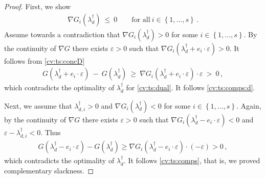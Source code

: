 \begin{proof}
First, we show 
\begin{gather}
  \label{cv:ts:comps:d}
\nabla G_i(\lambda_d^\dagger)
\ 
\le
\ 
0
\qquad
\text{for all}\ 
  i\in \left\{ 1,\ldots, s \right\}
  \,.
\end{gather}
Assume towards a contradiction that 
$
\nabla G_i(\lambda_d^\dagger)>0
$
for some 
$
  i\in \left\{ 1,\ldots, s \right\}
$.
By the continuity of $\nabla G$ there exists $\varepsilon>0$ such that 
$
\nabla G_i(
\lambda_d^\dagger
+
e_i\cdot \varepsilon
)
>
0
$.
It follows from \eqref{cv:ts:concD}
\begin{gather*}
  G
  (
\lambda_d^\dagger
+
e_i\cdot \varepsilon
  )
  \ 
  -
  \ 
  G
  (
\lambda_d^\dagger
  )
  \ 
  \ge
  \ 
\nabla G_i(
\lambda_d^\dagger
+
e_i\cdot \varepsilon
)
\cdot
\varepsilon
\ 
>
\ 
0
\,,
\end{gather*}
which contradicts the optimality of 
$
\lambda_d^\dagger
$
for \eqref{cv:ts:dual}.
It follows \eqref{cv:ts:comps:d}.

Next, 
we assume that
$ \lambda_{d,i}^\dagger>0 $ 
and 
$
  \nabla G_i(\lambda_d^\dagger)< 0
$
for some
$
  i\in \left\{ 1,\ldots, s \right\}
$.
Again, by the 
continuity of $\nabla G$ there exists $\varepsilon>0$ such that
$
  \nabla G_i(\lambda_d^\dagger-e_i\cdot \varepsilon)< 0
$
and
$
\varepsilon
-
\lambda_{d,i}^\dagger
<0
$.
Thus
\begin{gather*}
  G
  (
\lambda_d^\dagger
-
e_i\cdot \varepsilon
  )
  -
  G
  (
\lambda_d^\dagger
  )
  \ge
\nabla G_i(
\lambda_d^\dagger
-
e_i\cdot \varepsilon
)
\cdot
\left( 
  -
\varepsilon
\right)
>0
\,,
\end{gather*}
which contradicts the optimality of 
$
\lambda_d^\dagger
$.
It follows \eqref{cv:ts:comps}, that is,
we proved complementary slackness.

\end{proof}
